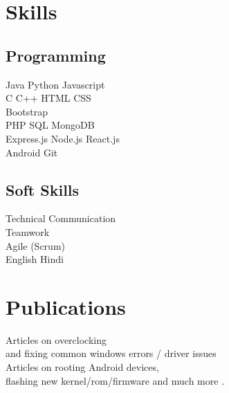 \documentclass[]{deedy-resume-openfont}
\begin{document}
\begin{minipage}[t]{0.33\textwidth}

\section{Skills}
\subsection{Programming}
Java \textbullet{} Python \textbullet{} Javascript \\
C \textbullet{} C++ \textbullet{} HTML \textbullet{} CSS \\
Bootstrap \\ 
PHP \textbullet{} SQL \textbullet{} MongoDB \\ Express.js \textbullet{} Node.js \textbullet{} React.js \\
Android \textbullet{} Git 
\sectionsep

\subsection{Soft Skills}
Technical Communication\\
Teamwork \\
Agile (Scrum)\\
English \textbullet{} Hindi\\
\sectionsep


\section{Publications} 
\textbullet{} Articles on overclocking \\
and fixing common windows errors / driver issues \\
\textbullet{} Articles on rooting Android devices, \\
flashing new kernel/rom/firmware and much more .
\sectionsep

%
%

\end{minipage} 
\hfill
\end{document}
